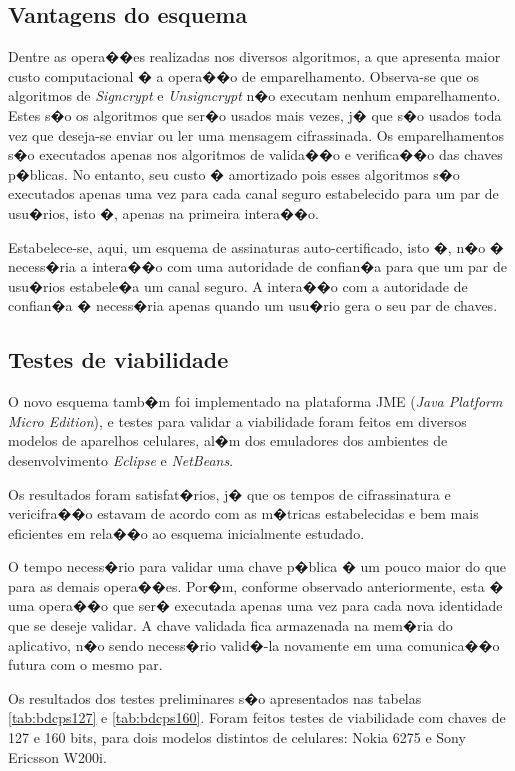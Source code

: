 \documentclass[a4paper,capchap,espacoduplo,normaltoc]{abntepusp}
\begin{document}
\subsection{Vantagens do esquema}
Dentre as opera��es realizadas nos diversos algoritmos, a que apresenta maior custo computacional � a opera��o de emparelhamento. Observa-se que os algoritmos de \emph{Signcrypt} e \emph{Unsigncrypt} n�o executam nenhum emparelhamento.  Estes s�o os algoritmos que ser�o usados mais vezes, j� que s�o usados toda vez que deseja-se enviar ou ler uma mensagem cifrassinada. Os emparelhamentos s�o executados apenas nos algoritmos de valida��o e verifica��o das chaves p�blicas. No entanto, seu custo � amortizado pois esses algoritmos s�o executados apenas uma vez para cada canal seguro estabelecido para um par de usu�rios, isto �, apenas na primeira intera��o. 

Estabelece-se, aqui, um esquema de assinaturas auto-certificado, isto �, n�o � necess�ria a intera��o com uma autoridade de confian�a para que um par de usu�rios estabele�a um canal seguro. A intera��o com a autoridade de confian�a � necess�ria apenas quando um usu�rio gera o seu par de chaves.

\subsection{Testes de viabilidade}
O novo esquema tamb�m foi implementado na plataforma JME (\emph{Java Platform Micro Edition}), e testes para validar a viabilidade foram feitos em diversos modelos de aparelhos celulares, al�m dos emuladores dos ambientes de desenvolvimento \emph{Eclipse} e \emph{NetBeans}.

Os resultados foram satisfat�rios, j� que os tempos de cifrassinatura e vericifra��o estavam de acordo com as m�tricas estabelecidas e bem mais eficientes em rela��o ao esquema inicialmente estudado. 

O tempo necess�rio para validar uma chave p�blica � um pouco maior do que para as demais opera��es. Por�m, conforme observado anteriormente, esta � uma opera��o que ser� executada apenas uma vez para cada nova identidade que se deseje validar. A chave validada fica armazenada na mem�ria do aplicativo, n�o sendo necess�rio valid�-la novamente em uma comunica��o futura com o mesmo par.

Os resultados dos testes preliminares s�o apresentados nas tabelas \ref{tab:bdcps127} e \ref{tab:bdcps160}. Foram feitos testes de viabilidade com chaves de 127 e 160 bits, para dois modelos distintos de celulares: Nokia 6275 e Sony Ericsson W200i.
\end{document}
